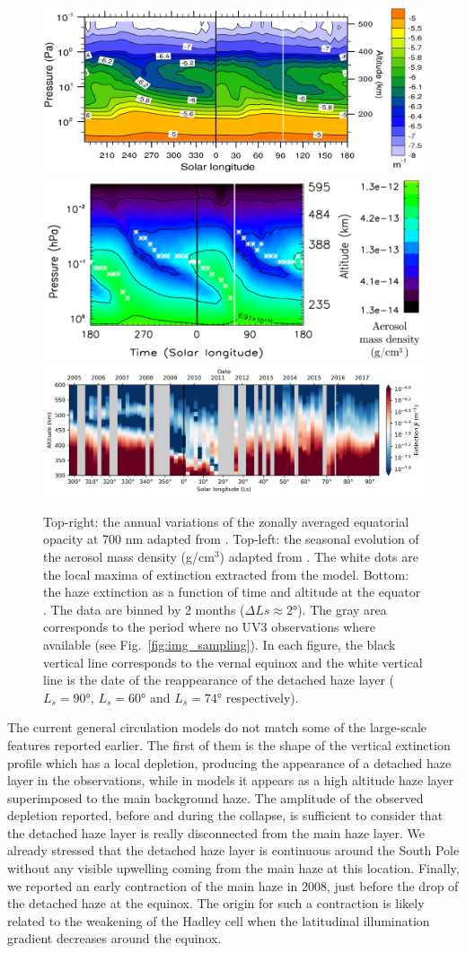 \begin{figure}[!ht]
    \centering
    \includegraphics[width=.4\textwidth]{Fig/Lebonnois2012_dhl_cycle.png}
    \includegraphics[width=.4\textwidth]{Fig/Larson2015_dhl_cycle.png}
    \includegraphics[width=.8\textwidth]{Fig/DHL_time_eq.png}
    \caption{Top-right: the annual variations of the zonally averaged equatorial opacity at 700 nm adapted
        from \cite{Lebonnois2012}.
        Top-left: the seasonal evolution of the aerosol mass density (g/cm$^3$) adapted from \cite{Larson2015}.
        The white dots are the local maxima of extinction extracted from the model.
        Bottom: the haze extinction as a function of time and altitude at the equator \citep[completed since][]{West2018}.
        The data are binned by 2 months ($\Delta Ls \approx \ang{2} $). The gray area corresponds to the period where
        no UV3 observations where available (see Fig.~\ref{fig:img_sampling}).
        In each figure, the black vertical line corresponds to the vernal equinox and the white vertical
        line is the date of the reappearance of the detached haze layer ($L_s = \ang{90}$, $L_s = \ang{60}$
        and $L_s = \ang{74}$ respectively).
    }
    \label{fig:gcm_cycle}
\end{figure}

The current general circulation models do not match some of the large-scale features reported earlier. The first of them
is the shape of the vertical extinction profile which has a local depletion, producing the appearance of a detached haze layer in the
observations, while in models it appears as a high altitude haze layer superimposed to the main background haze.
The amplitude of the observed depletion reported, before and during the collapse, is sufficient to consider that the
detached haze layer is really disconnected from the main haze layer. We already stressed that the detached haze layer is
continuous around the South Pole without any visible upwelling coming from the main haze at this location. Finally, we
reported an early contraction of the main haze in 2008, just before the drop of the detached haze at the equinox. The origin
for such a contraction is likely related to the weakening of the Hadley cell when the latitudinal illumination gradient
decreases around the equinox.

